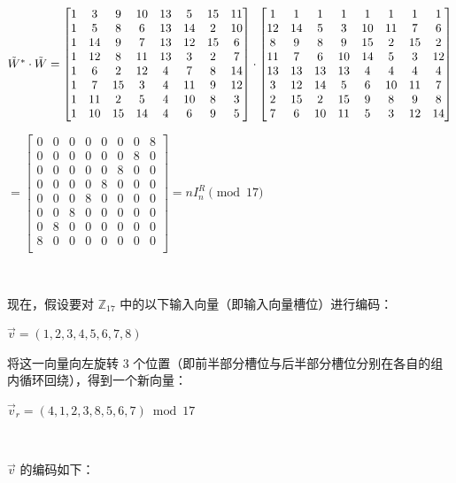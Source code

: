 $\tilde{W}^* \cdot \tilde{W} = \begin{bmatrix}
1&3&9&10&13&5&15&11\\
1&5&8&6&13&14&2&10\\
1&14&9&7&13&12&15&6\\
1&12&8&11&13&3&2&7\\
1&6&2&12&4&7&8&14\\
1&7&15&3&4&11&9&12\\
1&11&2&5&4&10&8&3\\
1&10&15&14&4&6&9&5\\
\end{bmatrix} \cdot \begin{bmatrix}
1 & 1 & 1 & 1 & 1 & 1 & 1 & 1\\
12&14&5&3&10&11&7&6\\
8&9&8&9&15&2&15&2\\
11&7&6&10&14&5&3&12\\
13&13&13&13&4&4&4&4\\
3&12&14&5&6&10&11&7\\
2&15&2&15&9&8&9&8\\
7&6&10&11&5&3&12&14\\
\end{bmatrix}$

$ = \begin{bmatrix}
0 & 0 & 0 & 0 & 0 & 0 & 0 & 8\\
0 & 0 & 0 & 0 & 0 & 0 & 8 & 0\\
0 & 0 & 0 & 0 & 0 & 8 & 0 & 0\\
0 & 0 & 0 & 0 & 8 & 0 & 0 & 0\\
0 & 0 & 0 & 8 & 0 & 0 & 0 & 0\\
0 & 0 & 8 & 0 & 0 & 0 & 0 & 0\\
0 & 8 & 0 & 0 & 0 & 0 & 0 & 0\\
8 & 0 & 0 & 0 & 0 & 0 & 0 & 0\\
\end{bmatrix} = n I_n^{R} \pmod{17}$

$ $

现在，假设要对 $\mathbb{Z}_{17}$ 中的以下输入向量（即输入向量槽位）进行编码：

$\vec{v} = (1, 2, 3, 4, 5, 6, 7, 8)$

将这一向量向左旋转 3 个位置（即前半部分槽位与后半部分槽位分别在各自的组内循环回绕），得到一个新向量：

$\vec{v}_r = (4, 1, 2, 3, 8, 5, 6, 7) \bmod 17$

$ $

$\vec{v}$ 的编码如下：

